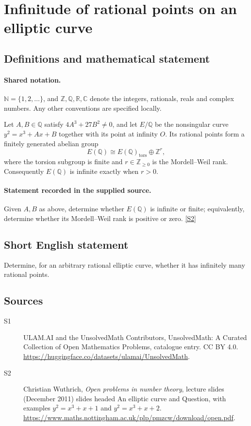 \documentclass[11pt]{article}
\newcommand{\sref}[2]{\hyperlink{source:#1:#2}{[S#2]}}
\begin{document}
\section{Infinitude of rational points on an elliptic curve}\label{statement}

\subsection{Definitions and mathematical statement}

\paragraph{Shared notation.}$\mathbb N=\{1,2,\ldots\}$, and $\mathbb Z,\mathbb Q,\mathbb R,\mathbb C$ denote the integers, rationals, reals and complex numbers. Any other conventions are specified locally.


Let $A,B\in\mathbb Q$ satisfy $4A^3+27B^2\ne0$, and let $E/\mathbb Q$ be the nonsingular curve $y^2=x^3+Ax+B$ together with its point at infinity $O$. Its rational points form a finitely generated abelian group
\[
E(\mathbb Q)\cong E(\mathbb Q)_{\mathrm{tors}}\oplus\mathbb Z^r,
\]
where the torsion subgroup is finite and $r\in\mathbb Z_{\ge0}$ is the Mordell--Weil rank. Consequently $E(\mathbb Q)$ is infinite exactly when $r>0$.
\paragraph{Statement recorded in the supplied source.}
Given $A,B$ as above, determine whether $E(\mathbb Q)$ is infinite or finite; equivalently, determine whether its Mordell--Weil rank is positive or zero. \sref{statement}{2}
\subsection{Short English statement}
Determine, for an arbitrary rational elliptic curve, whether it has infinitely many rational points.
\subsection{Sources}
\begin{description}
\item[\hypertarget{source:statement:1}{S1}] ULAM.AI and the UnsolvedMath Contributors, UnsolvedMath: A Curated Collection of Open Mathematics Problems, catalogue entry. CC BY 4.0. \url{https://huggingface.co/datasets/ulamai/UnsolvedMath}.
\item[\hypertarget{source:statement:2}{S2}] Christian Wuthrich, \emph{Open problems in number theory}, lecture slides (December 2011) slides headed An elliptic curve and Question, with examples $y^2=x^3+x+1$ and $y^2=x^3+x+2$. \url{https://www.maths.nottingham.ac.uk/plp/pmzcw/download/open.pdf}.
\end{description}
\label{end:statement}
\end{document}
